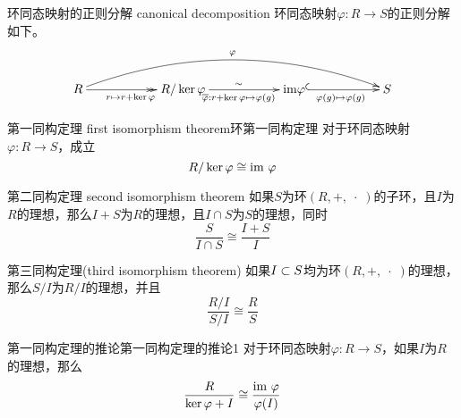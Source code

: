 \begin{definition}{环同态映射的正则分解 canonical decomposition}
	环同态映射$\varphi:R\to S$的正则分解如下。
	$$
	\xymatrix@=13ex{
		R \ar@/^2pc/[rrr]^{\varphi} \ar@{->>}[r]_{r\mapsto r+\ker\varphi} & R/\ker\varphi \ar@{->}[r]_{\overline{\varphi}:r+\ker\varphi\mapsto \varphi(g)}^{\sim} & \mathrm{im}\varphi \ar@{^{(}->}[r]_{\varphi(g)\mapsto \varphi(g)} & S
	}
	$$
\end{definition}

\begin{theorem}{第一同构定理 first isomorphism theorem}{环第一同构定理}
	对于环同态映射$\varphi:R\to S$，成立
	$$
	R/\ker\varphi \cong \text{im } \varphi
	$$
\end{theorem}

\begin{theorem}{第二同构定理 second isomorphism theorem}
	如果$S$为环$(R,+,\;\cdot\;)$的子环，且$I$为$R$的理想，那么$I+S$为$R$的理想，且$I\cap S$为$S$的理想，同时
	$$
	\frac{S}{I\cap S}\cong\frac{I+S}{I}
	$$
\end{theorem}

\begin{theorem}{第三同构定理(third isomorphism theorem)}
	如果$I\subset S$均为环$(R,+,\;\cdot\;)$的理想，那么$S/I$为$R/I$的理想，并且
	$$
	\frac{R/I}{S/I}\cong \frac{R}{S}
	$$
\end{theorem}

\begin{proposition}{第一同构定理的推论}{第一同构定理的推论1}
	对于环同态映射$\varphi:R\to S$，如果$I$为$R$的理想，那么
	$$
	\frac{R}{\ker\varphi+I}\cong\frac{\text{im } \varphi}{\varphi(I)}
	$$
\end{proposition}

